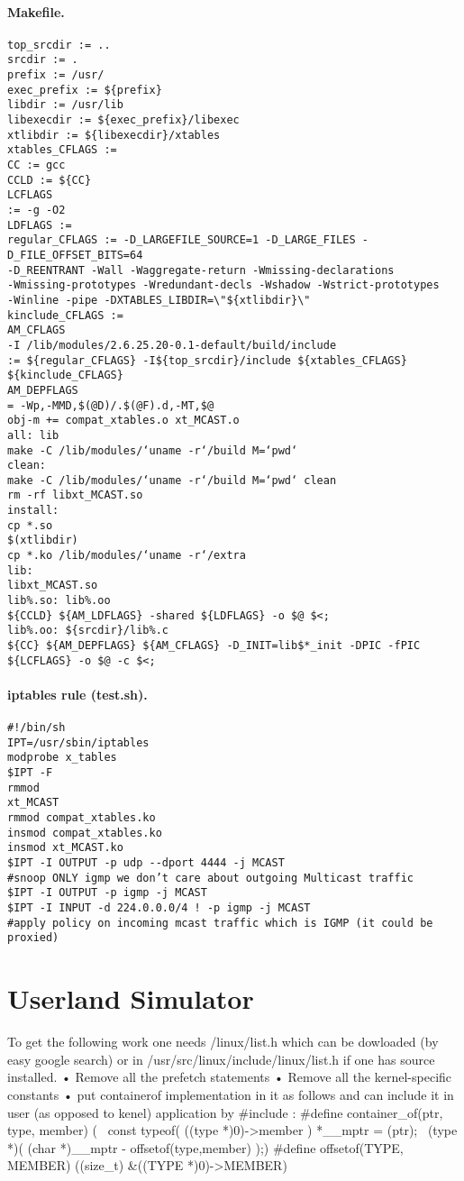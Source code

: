 \subsubsection{Makefile.}
\begin{verbatim}
top_srcdir := ..
srcdir := .
prefix := /usr/
exec_prefix := ${prefix}
libdir := /usr/lib
libexecdir := ${exec_prefix}/libexec
xtlibdir := ${libexecdir}/xtables
xtables_CFLAGS :=
CC := gcc
CCLD := ${CC}
LCFLAGS
:= -g -O2
LDFLAGS :=
regular_CFLAGS := -D_LARGEFILE_SOURCE=1 -D_LARGE_FILES -D_FILE_OFFSET_BITS=64
-D_REENTRANT -Wall -Waggregate-return -Wmissing-declarations
-Wmissing-prototypes -Wredundant-decls -Wshadow -Wstrict-prototypes
-Winline -pipe -DXTABLES_LIBDIR=\"${xtlibdir}\"
kinclude_CFLAGS :=
AM_CFLAGS
-I /lib/modules/2.6.25.20-0.1-default/build/include
:= ${regular_CFLAGS} -I${top_srcdir}/include ${xtables_CFLAGS}
${kinclude_CFLAGS}
AM_DEPFLAGS
= -Wp,-MMD,$(@D)/.$(@F).d,-MT,$@
obj-m += compat_xtables.o xt_MCAST.o
all: lib
make -C /lib/modules/‘uname -r‘/build M=‘pwd‘
clean:
make -C /lib/modules/‘uname -r‘/build M=‘pwd‘ clean
rm -rf libxt_MCAST.so
install:
cp *.so
$(xtlibdir)
cp *.ko /lib/modules/‘uname -r‘/extra
lib:
libxt_MCAST.so
lib%.so: lib%.oo
${CCLD} ${AM_LDFLAGS} -shared ${LDFLAGS} -o $@ $<;
lib%.oo: ${srcdir}/lib%.c
${CC} ${AM_DEPFLAGS} ${AM_CFLAGS} -D_INIT=lib$*_init -DPIC -fPIC
${LCFLAGS} -o $@ -c $<;
\end{verbatim}
\subsubsection{iptables rule (test.sh).}
\begin{verbatim}
#!/bin/sh
IPT=/usr/sbin/iptables
modprobe x_tables
$IPT -F
rmmod
xt_MCAST
rmmod compat_xtables.ko
insmod compat_xtables.ko
insmod xt_MCAST.ko
$IPT -I OUTPUT -p udp --dport 4444 -j MCAST
#snoop ONLY igmp we don’t care about outgoing Multicast traffic
$IPT -I OUTPUT -p igmp -j MCAST
$IPT -I INPUT -d 224.0.0.0/4 ! -p igmp -j MCAST
#apply policy on incoming mcast traffic which is IGMP (it could be proxied)
\end{verbatim} 
\chapter{Userland Simulator}
To get the following work one needs /linux/list.h which can be dowloaded
(by easy google search) or in /usr/src/linux/include/linux/list.h if one has source
installed.
• Remove all the prefetch statements
• Remove all the kernel-specific constants
• put containerof implementation in it as follows and can include it in user
(as opposed to kenel) application by #include :
#define container_of(ptr, type, member) ({ \
const typeof( ((type *)0)->member ) *__mptr = (ptr);
\
(type *)( (char *)__mptr - offsetof(type,member) );})
#define offsetof(TYPE, MEMBER) ((size_t) &((TYPE *)0)->MEMBER)
